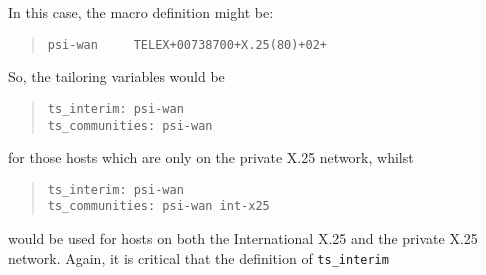 In this case,
the macro definition might be:
\begin{quote}\small\begin{verbatim}
psi-wan     TELEX+00738700+X.25(80)+02+
\end{verbatim}\end{quote}
So,
the tailoring variables would be
\begin{quote}\small\begin{verbatim}
ts_interim: psi-wan
ts_communities: psi-wan
\end{verbatim}\end{quote}
for those hosts which are only on the private X.25 network,
whilst
\begin{quote}\small\begin{verbatim}
ts_interim: psi-wan
ts_communities: psi-wan int-x25
\end{verbatim}\end{quote}
would be used for hosts on both the International X.25 and the private X.25
network.
Again, it is critical that the definition of \verb"ts_interim"
